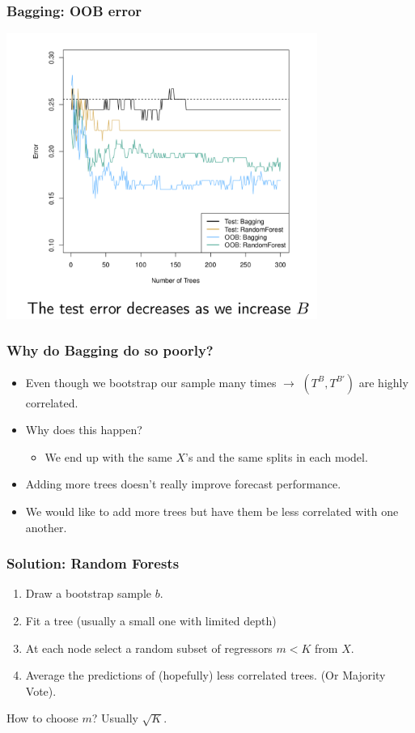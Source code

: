 \documentclass[xcolor=pdftex,dvipsnames,table,mathserif]{beamer}
\begin{document}
\begin{frame}
\frametitle{Bagging: OOB error}
\includegraphics[width=4in]{./resources/bagging.png}
\end{frame}

\begin{frame}
\frametitle{Why do Bagging do so poorly?}
\begin{itemize}
\item Even though we bootstrap our sample many times $\rightarrow$ $(T^B,T^{B'})$ are highly correlated.
\item Why does this happen?
\begin{itemize}
\item We end up with the same $X$'s and the same splits in each model.
\end{itemize}
\item Adding more trees doesn't really improve forecast performance.
\item We would like to add more trees but have them be \alert{less correlated} with one another.
\end{itemize}
\end{frame}


\begin{frame}
\frametitle{Solution: Random Forests}
\begin{enumerate}
\item Draw a bootstrap sample $b$.
\item Fit a tree (usually a small one with limited depth)
\item At each node select a \alert{random subset} of regressors $m < K$ from $X$.
\item Average the predictions of (hopefully) less correlated trees. (Or Majority Vote).
\end{enumerate}
How to choose $m$? Usually $\sqrt{K}$.
\end{frame}
\end{document}
